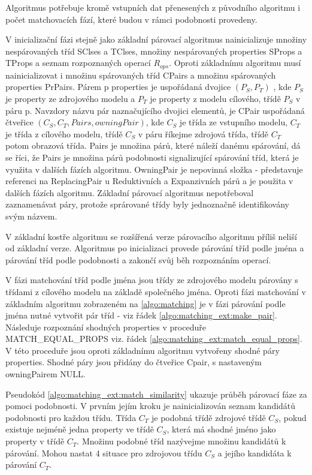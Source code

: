 \documentclass[11pt,twoside,a4paper]{book}
\begin{document}
Algoritmus potřebuje kromě vstupních dat přenesených z původního algoritmu i
počet matchovacích fází, které budou v rámci podobnosti provedeny.

V inicializační fázi stejně jako základní párovací algoritmus nainicializuje
množiny nespárovaných tříd SClses a TClses, množiny nespárovaných properties
SProps a TProps a seznam rozpoznaných operací $R_{ops}$.
Oproti základnímu algoritmu musí nainicializovat i množinu spárovaných tříd
CPairs a množinu spárovaných properties PrPairs. Párem p properties je
uspořádaná dvojice $(P_S, P_T)$ , kde $P_S$ je property ze zdrojového modelu
a $P_T$ je property z modelu cílového, třídě $P_S$ v páru p. Navzdory názvu pár
naznačujícího dvojici elementů, je CPair uspořádaná čtveřice $(C_S, C_T, Pairs,
owningPair)$, kde $C_S$ je třída ze vstupního modelu, $C_T$ je třída z cílového
modelu, třídě $C_S$ v páru říkejme zdrojová třída, třídě $C_T$ potom obrazová třída.
Pairs je množina párů, které náleží danému spárování, dá se říci, že Pairs je množina
párů podobnosti signalizující spárování tříd, která je využita v dalších fázích
algoritmu. OwningPair je nepovinná složka - představuje referenci na
ReplacingPair u Reduktivních a Expanzivních párů a je použita v dalších fázích
algoritmu. Základní párovací algoritmus nepotřeboval zaznamenávat páry, protože
sprárované třídy byly jednoznačně identifikovány svým názvem.

V základní kostře algoritmu se rozšířená verze párovacího algoritmu příliš
neliší od základní verze.  Algoritmus po inicializaci provede párování tříd
podle jména a párování tříd podle podobnosti a zakončí svůj běh rozpoznáním
operací.

V fázi matchování tříd podle jména jsou třídy ze zdrojového modelu párovány s
třídami z cílového modelu na základě společného jména. Oproti fázi matchování v
základním algoritmu zobrazeném na \ref{algo:matching} je v fázi párování podle
jména nutné vytvořit pár tříd - viz řádek \ref{algo:matching_ext:make_pair}.
Následuje rozpoznání shodných properties v proceduře MATCH\_EQUAL\_PROPS viz.
řádek \ref{algo:matching_ext:match_equal_props}. V této proceduře jsou oproti
základnímu algoritmu vytvořeny shodné páry properties. Shodné páry jsou přidány
do čtveřice Cpair, s nastaveným owningPairem NULL.

Pseudokód \ref{algo:matching_ext:match_similarity} ukazuje průběh párovací fáze
za pomoci podobnosti. V prvním jejím kroku je nainicializován seznam
kandidátů podobnosti pro každou třídu. Třída $C_T$ je podobná třídě zdrojové
třídě $C_S$, pokud existuje nejméně jedna property ve třídě $C_S$, která má
shodné jméno jako property v třídě $C_T$. Množinu podobné tříd nazývejme
množinu kandidátů k párování. Mohou nastat 4 situace pro zdrojovou třídu $C_S$ a
jejího kandidáta k párování $C_T$.
\end{document}
